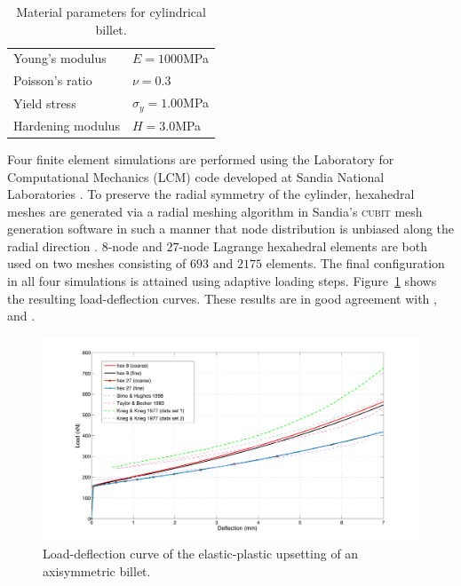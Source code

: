 \documentclass[12pt]{article}
\begin{document}
\begin{table}[htbp]
  \begin{center}
    \begin{tabular}{ l l }
      \toprule      
      Young's modulus
      &
      $E = 1000$MPa
      \\
      Poisson's ratio
      &
      $\nu = 0.3$
      \\
      Yield stress  
      &
      $\sigma_{y} = 1.00$MPa
      \\
      Hardening modulus   
      &
      $H=3.0$MPa
      \\
      \bottomrule
    \end{tabular}
    \caption{Material parameters for cylindrical billet.}
    \label{tab:upset-billet}
  \end{center}
\end{table}

Four finite element simulations are performed using the Laboratory for
Computational Mechanics (LCM) code developed at Sandia National
Laboratories \citep{lcm}.
To preserve the radial symmetry of the cylinder, hexahedral meshes are generated via a radial meshing algorithm
in Sandia's \textsc{cubit} mesh generation software in such a manner that node
distribution is unbiased along the radial direction \citep{cubit}. $8$-node and
$27$-node Lagrange hexahedral elements are both used on two meshes consisting of
$693$ and $2175$ elements. The final configuration in all four simulations is
attained using adaptive loading steps.
Figure~\ref{fig:load-deflection} shows the resulting load-deflection curves.
These results are in good agreement with \citet{Krieg.Krieg:1977},
\citet{Taylor.Becker:1983} and \citet{Simo.Hughes:1998}.

\begin{figure}[htbp]
  \begin{center}
    \unitlength=1.0mm
      \includegraphics[width=160mm]{Load_Deflection.pdf}
      \caption{Load-deflection curve of the elastic-plastic upsetting
        of an axisymmetric billet. }
    \label{fig:load-deflection}
  \end{center}
\end{figure}
\end{document}
